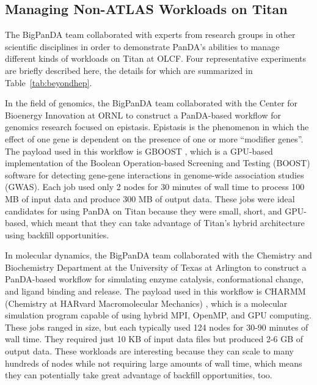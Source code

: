 \subsection{Managing Non-ATLAS Workloads on Titan}
\label{subsec:other-workloads}

The BigPanDA team collaborated with experts from research groups in other
scientific disciplines in order to demonstrate PanDA's abilities to manage
different kinds of workloads on Titan at OLCF. Four representative experiments
are briefly described here, the details for which are summarized in
Table~\ref{tab:beyondhep}.

In the field of genomics, the BigPanDA team collaborated with the Center for
Bioenergy Innovation at ORNL to construct a PanDA-based workflow for genomics
research focused on epistasis. Epistasis is the phenomenon in which the effect
of one gene is dependent on the presence of one or more ``modifier genes''. The
payload used in this workflow is GBOOST \cite{GBOOST}, which is a GPU-based
implementation of the Boolean Operation-based Screening and Testing (BOOST)
software for detecting gene-gene interactions in genome-wide association
studies (GWAS). Each job used only 2 nodes for 30 minutes of wall time to
process 100 MB of input data and produce 300 MB of output data. These jobs were
ideal candidates for using PanDA on Titan because they were small, short, and
GPU-based, which meant that they can take advantage of Titan's hybrid
architecture using backfill opportunities.

In molecular dynamics, the BigPanDA team collaborated with the Chemistry and
Biochemistry Department at the University of Texas at Arlington to construct a
PanDA-based workflow for simulating enzyme catalysis, conformational change,
and ligand binding and release. The payload used in this workflow is CHARMM
(Chemistry at HARvard Macromolecular Mechanics) \cite{Brooks2009CHARMM}, which
is a molecular simulation program capable of using hybrid MPI, OpenMP, and GPU
computing. These jobs ranged in size, but each typically used 124 nodes for
30-90 minutes of wall time. They required just 10 KB of input data files but
produced 2-6 GB of output data. These workloads are interesting because they
can scale to many hundreds of nodes while not requiring large amounts of wall
time, which means they can potentially take great advantage of backfill
opportunities, too.

